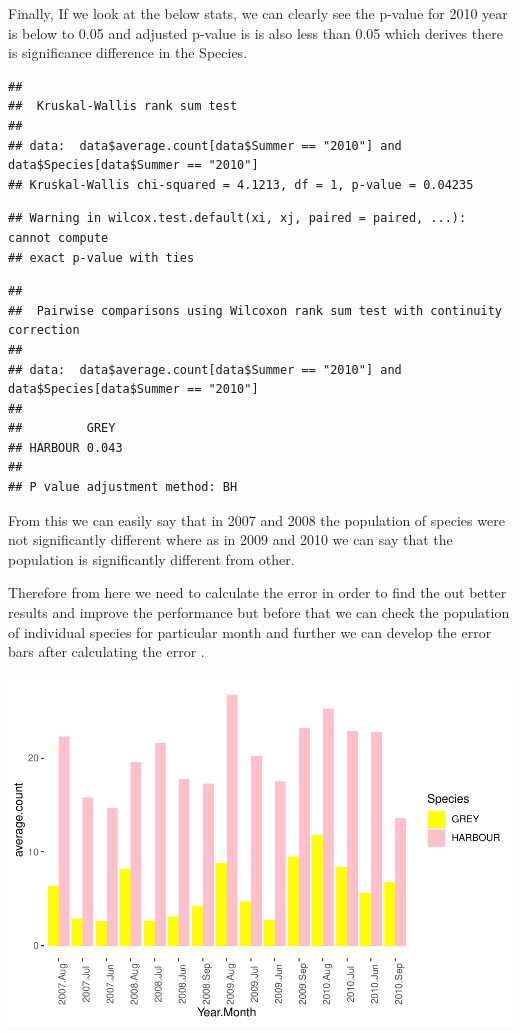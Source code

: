\documentclass[
]{article}
\begin{document}
Finally, If we look at the below stats, we can clearly see the p-value
for 2010 year is below to 0.05 and adjusted p-value is is also less than
0.05 which derives there is significance difference in the Species.

\begin{verbatim}
## 
##  Kruskal-Wallis rank sum test
## 
## data:  data$average.count[data$Summer == "2010"] and data$Species[data$Summer == "2010"]
## Kruskal-Wallis chi-squared = 4.1213, df = 1, p-value = 0.04235
\end{verbatim}

\begin{verbatim}
## Warning in wilcox.test.default(xi, xj, paired = paired, ...): cannot compute
## exact p-value with ties
\end{verbatim}

\begin{verbatim}
## 
##  Pairwise comparisons using Wilcoxon rank sum test with continuity correction 
## 
## data:  data$average.count[data$Summer == "2010"] and data$Species[data$Summer == "2010"] 
## 
##         GREY 
## HARBOUR 0.043
## 
## P value adjustment method: BH
\end{verbatim}

From this we can easily say that in 2007 and 2008 the population of
species were not significantly different where as in 2009 and 2010 we
can say that the population is significantly different from other.

Therefore from here we need to calculate the error in order to find the
out better results and improve the performance but before that we can
check the population of individual species for particular month and
further we can develop the error bars after calculating the error .

\includegraphics{Statistical-analysis-in-RStudio_files/figure-latex/unnamed-chunk-33-1.pdf}
\end{document}
